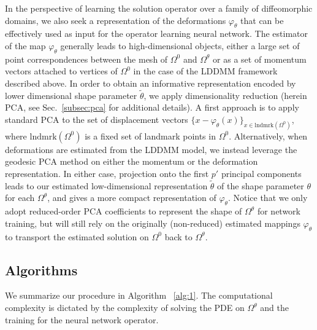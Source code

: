 \documentclass[review]{elsarticle}
\def\Omegatheta{{\Omega^\theta}}
\def\refd{0}
\def\Omegaref{{\Omega^\refd}}
\begin{document}
In the perspective of learning the solution operator over a family of diffeomorphic domains, we also seek a representation of the deformations $\varphi_\theta$ that can be effectively used as input for the operator learning neural network. The estimator of the map $\varphi_\theta$ generally leads to high-dimensional objects, either a large set of point correspondences between the mesh of $\Omegaref$ and $\Omega^\theta$ or as a set of momentum vectors attached to vertices of $\Omegaref$ in the case of the LDDMM framework described above. In order to obtain an informative representation encoded by lower dimensional shape parameter $\tilde{\theta}$, we apply dimensionality reduction (herein PCA, see Sec.~\ref{subsec:pca} for additional details). A first approach is to apply standard PCA to the set of displacement vectors $\{x-\varphi_\theta(x)\}_{x\in\mathrm{lndmrk}(\Omegaref)}$, where $\mathrm{lndmrk}(\Omegaref)$ is a fixed set of landmark points in $\Omegaref$. Alternatively, when deformations are estimated from the LDDMM model, we instead leverage the geodesic PCA method \cite{fletcher2004principal} on either the momentum or the deformation representation. In either case, projection onto the first $p'$ principal components leads to our estimated low-dimensional representation $\tilde{\theta}$ of the shape parameter $\theta$ for each $\Omegatheta$, and gives a more compact representation of $\varphi_\theta$. Notice that we only adopt reduced-order PCA coefficients to represent the shape of $\Omegatheta$ for network training, but will still rely on the originally (non-reduced) estimated mappings $\varphi_\theta$ to transport the estimated solution on $\Omegaref$ back to $\Omegatheta$.   


\subsection{Algorithms}

We summarize our procedure in Algorithm ~\ref{alg:1}. The computational complexity is dictated by the complexity of solving the PDE on $\Omega^\theta$ and the training for the neural network operator. 
\end{document}
